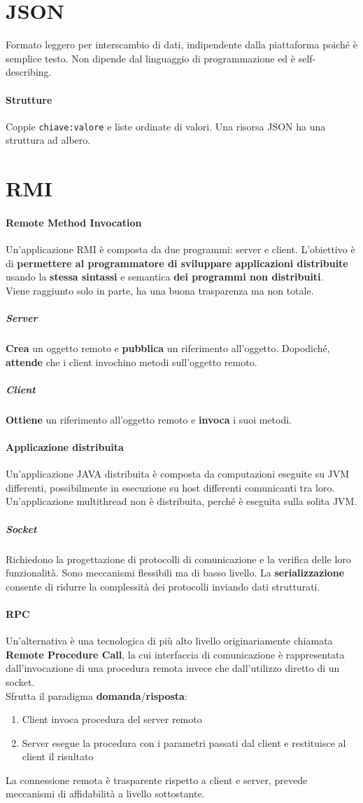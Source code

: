\documentclass[10pt]{article}
\begin{document}
\section{JSON}
Formato leggero per interscambio di dati, indipendente dalla piattaforma poiché è semplice testo. Non dipende dal linguaggio di programmazione ed è self-describing.
\paragraph{Strutture} Coppie \texttt{chiave:valore} e liste ordinate di valori. Una risorsa JSON ha una struttura ad albero.
\section{RMI}
\paragraph{Remote Method Invocation} Un'applicazione RMI è composta da due programmi: server e client. L'obiettivo è di \textbf{permettere al programmatore di sviluppare applicazioni distribuite} usando la \textbf{stessa sintassi} e semantica \textbf{dei programmi non distribuiti}.\\
Viene raggiunto solo in parte, ha una buona trasparenza ma non totale.
\subparagraph{Server} \textbf{Crea} un oggetto remoto e \textbf{pubblica} un riferimento all'oggetto. Dopodiché, \textbf{attende} che i client invochino metodi sull'oggetto remoto.
\subparagraph{Client} \textbf{Ottiene} un riferimento all'oggetto remoto e \textbf{invoca} i suoi metodi.
\paragraph{Applicazione distribuita} Un'applicazione JAVA distribuita è composta da computazioni eseguite su JVM differenti, possibilmente in esecuzione su host differenti comunicanti tra loro. Un'applicazione multithread non è distribuita, perché è eseguita sulla solita JVM.
\subparagraph{Socket} Richiedono la progettazione di protocolli di comunicazione e la verifica delle loro funzionalità. Sono meccanismi flessibili ma di basso livello. La \textbf{serializzazione} consente di ridurre la complessità dei protocolli inviando dati strutturati.
\paragraph{RPC} Un'alternativa è una tecnologica di più alto livello originariamente chiamata \textbf{Remote Procedure Call}, la cui interfaccia di comunicazione è rappresentata dall'invocazione di una procedura remota invece che dall'utilizzo diretto di un socket.\\
Sfrutta il paradigma \textbf{domanda}/\textbf{risposta}:
\begin{enumerate}
	\item Client invoca procedura del server remoto
	\item Server esegue la procedura con i parametri passati dal client e restituisce al client il risultato
\end{enumerate}
La connessione remota è trasparente rispetto a client e server, prevede meccanismi di affidabilità a livello sottostante.
\end{document}
